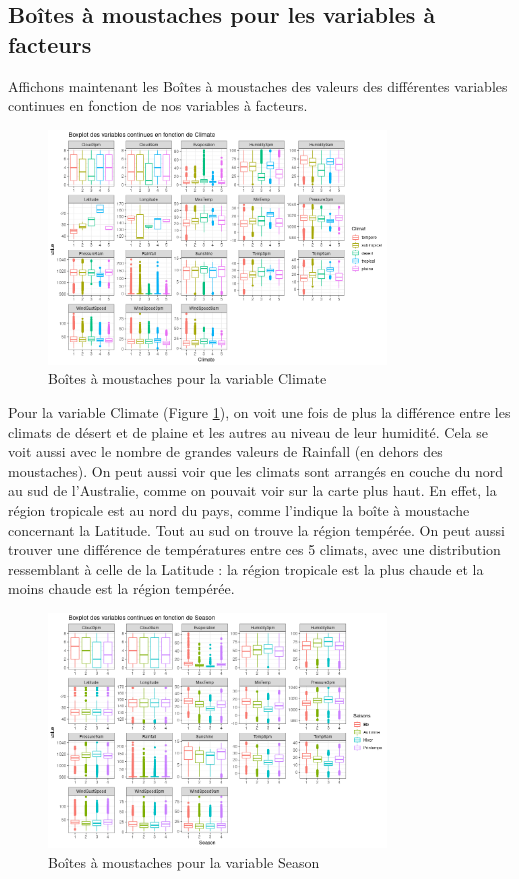 \documentclass{article}
\begin{document}
\subsection{Boîtes à moustaches pour les variables à facteurs}

Affichons maintenant les Boîtes à moustaches des valeurs des différentes variables continues en fonction de nos variables à facteurs. 

\begin{figure}[htp]
    \centering
    \includegraphics[width=0.8\textwidth]{Images/boxplots/boxplot_Climate.png}
    \caption{Boîtes à moustaches pour la variable Climate}
    \label{fig:bp_climate}
\end{figure}

Pour la variable Climate (Figure \ref{fig:bp_climate}), on voit une fois de plus la différence entre les climats de désert et de plaine et les autres au niveau de leur humidité. Cela se voit aussi avec le nombre de grandes valeurs de Rainfall (en dehors des moustaches). On peut aussi voir que les climats sont arrangés en couche du nord au sud de l'Australie, comme on pouvait voir sur la carte plus haut. En effet, la région tropicale est au nord du pays, comme l'indique la boîte à moustache concernant la Latitude. Tout au sud on trouve la région tempérée. On peut aussi trouver une différence de températures entre ces 5 climats, avec une distribution ressemblant à celle de la Latitude : la région tropicale est la plus chaude et la moins chaude est la région tempérée. 

\begin{figure}[htp]
    \centering
    \includegraphics[width=0.8\textwidth]{Images/boxplots/boxplot_Season.png}
    \caption{Boîtes à moustaches pour la variable Season}
    \label{fig:bp_season}
\end{figure}
\end{document}
